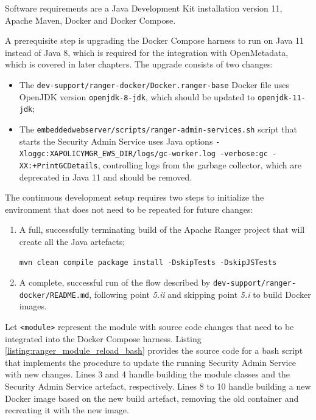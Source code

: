 Software requirements are a Java Development Kit installation version 11, Apache Maven, Docker and Docker Compose. 

A prerequisite step is upgrading the Docker Compose harness to run on Java 11 instead of Java 8, which is required for the integration with OpenMetadata, which is covered in later chapters. The upgrade consists of two changes:

\begin{itemize}
    \item The \texttt{dev-support/ranger-docker/Docker.ranger-base} Docker file uses OpenJDK version \texttt{openjdk-8-jdk}, which should be updated to \texttt{openjdk-11-jdk};
    \item The \texttt{embeddedwebserver/scripts/ranger-admin-services.sh} script that starts the Security Admin Service uses Java options \texttt{-Xloggc:{XAPOLICYMGR_EWS_DIR}/logs/gc-worker.log -verbose:gc -XX:+PrintGCDetails}, controlling logs from the garbage collector, which are deprecated in Java 11 and should be removed.
\end{itemize}

The continuous development setup requires two steps to initialize the environment that does not need to be repeated for future changes:

\begin{enumerate}

\item A full, successfully terminating build of the Apache Ranger project that will create all the Java artefacts;
\begin{verbatim}
mvn clean compile package install -DskipTests -DskipJSTests
\end{verbatim}

\item A complete, successful run of the flow described by \texttt{dev-support/ranger-docker/README.md}, following point \textit{5.ii} and skipping point \textit{5.i} to build Docker images.

\end{enumerate}

Let \texttt{<module>} represent the module with source code changes that need to be integrated into the Docker Compose harness. Listing \ref{listing:ranger_module_reload_bash} provides the source code for a bash script that implements the procedure to update the running Security Admin Service with new changes. Lines 3 and 4 handle building the module classes and the Security Admin Service artefact, respectively. Lines 8 to 10 handle building a new Docker image based on the new build artefact, removing the old container and recreating it with the new image. 

